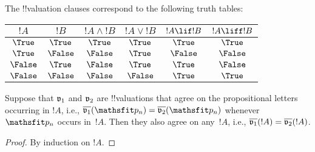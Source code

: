 \documentclass[../../../include/open-logic-section]{subfiles}
\begin{document}
\begin{explain} 
The !!{valuation} clauses correspond to the following truth tables:
\begin{center}
\begin{tabular}{|cc||c|c|c|c|} \hline 
$!A$ & $!B$ & $!A \land !B$ & $!A \lor !B$ & $!A \lif !B$ & $!A \liff !B$\\ 
\hline \hline 
$\True$ & $\True$ & $\True$ & $\True$ & $\True$ & $\True$\\ 
$\True$ & $\False$ & $\False$ & $\True$ & $\False$ & $\False$\\ 
$\False$ & $\True$ & $\False$ & $\True$ & $\True$ & $\False$\\
$\False$ & $\False$ & $\False$ & $\False$ & $\True$ & $\True$\\ 
\hline 
\end{tabular}
\end{center} 
\end{explain}

\begin{thm}  
 Suppose that $\mathfrak v_1$ and
$\mathfrak v_2$ are !!{valuation}s that agree on the propositional
letters occurring in $!A$, i.e., $\pValue{v_1}{\Obj p_n} =
\pValue{v_2}{\Obj p_n}$ whenever $\Obj p_n$ occurs in~$!A$. Then they
also agree on any~$!A$, i.e., $\overline{\mathfrak v_1}(!A) = \overline{\mathfrak v_2}(!A)$.
\end{thm}

\begin{proof} 
By induction on $!A$. 
\end{proof}
\end{document}
